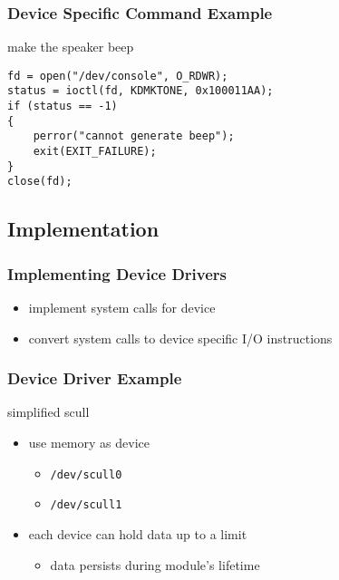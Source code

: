 \documentclass[dvipsnames]{beamer}
\begin{document}
\begin{frame}[fragile]
  \frametitle{Device Specific Command Example}

  \begin{exampleblock}{make the speaker beep}
    \begin{lstlisting}
fd = open("/dev/console", O_RDWR);
status = ioctl(fd, KDMKTONE, 0x100011AA);
if (status == -1)
{
    perror("cannot generate beep");
    exit(EXIT_FAILURE);
}
close(fd);
    \end{lstlisting}
  \end{exampleblock}
\end{frame}

\subsection{Implementation}

\begin{frame}
  \frametitle{Implementing Device Drivers}

  \begin{itemize}
    \item implement system calls for device
    \item convert system calls to device specific I/O instructions
  \end{itemize}
\end{frame}

\begin{frame}
  \frametitle{Device Driver Example}

  \begin{exampleblock}{simplified scull}
    \begin{itemize}
      \item use memory as device
      \begin{itemize}
        \item \texttt{/dev/scull0}
        \item \texttt{/dev/scull1}
      \end{itemize}

      \item each device can hold data up to a limit
      \begin{itemize}
        \item data persists during module's lifetime
      \end{itemize}
    \end{itemize}
  \end{exampleblock}
\end{frame}
\end{document}
